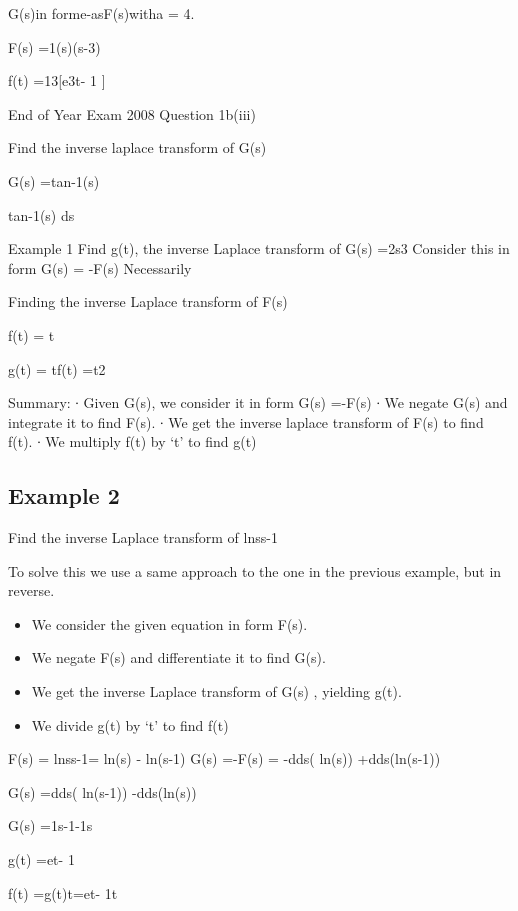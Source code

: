 \begin{frame}
G(s)in forme-asF(s)witha = 4.


F(s) =1(s)(s-3)


f(t) =13[e3t- 1 ]

End of Year Exam  2008 Question 1b(iii)

Find the inverse laplace transform of G(s)

G(s) =tan-1(s)

tan-1(s) ds


Example 1
Find g(t), the inverse Laplace transform of G(s) =2s3
Consider this in form G(s) = -F(s)
Necessarily 
 
Finding the inverse Laplace transform of F(s)
 
f(t) = t
 

g(t) = tf(t) =t2
 
Summary:
∙       Given G(s), we consider it in form G(s) =-F(s)
∙       We negate G(s) and integrate it to find F(s).
∙       We get the inverse laplace transform of F(s) to find f(t).
∙       We multiply f(t) by ‘t’ to find g(t)
 
\newpage
\subsection*{Example 2}
Find the inverse Laplace transform of lnss-1
 
To solve this we use a same approach to the one in the previous example, but in reverse.
\begin{itemize}
\item       We consider the given equation in form F(s).
\item      We negate F(s) and differentiate it to find G(s).
\item       We get the inverse Laplace transform of G(s) , yielding g(t).
\item      We divide g(t) by ‘t’ to find f(t)
\end{itemize}

 F(s) = lnss-1= ln(s) - ln(s-1)      	 
G(s) =-F(s) = -dds( ln(s)) +dds(ln(s-1))

G(s) =dds( ln(s-1)) -dds(ln(s))

G(s) =1s-1-1s

g(t) =et- 1

f(t) =g(t)t=et- 1t


\end{frame}
